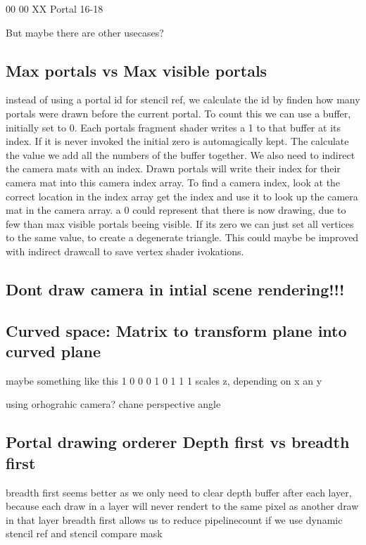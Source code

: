 00 00 XX Portal 16-18

But  maybe there are other usecases?




\subsection{Max portals vs Max visible portals}
instead of using a portal id for stencil ref, we calculate the id by finden how many portals were drawn before the current portal.
To count this we can use a buffer, initially set to 0. Each portals fragment shader writes a 1 to that buffer at its index. If it is never invoked the initial zero is automagically kept. The calculate the value we add all the numbers of the buffer together.
We also need to indirect the camera mats with an index. Drawn portals will write their index for their camera mat into this camera index array.
To find a camera index, look at the correct location in the index array get the index and use it to look up the camera mat in the camera array. a 0 could represent that there is now drawing, due to few than max visible portals beeing visible. If its zero we can just set all vertices to the same value, to create a degenerate triangle.
This could maybe be improved with indirect drawcall to save vertex shader ivokations.

\subsection{Dont draw camera in intial scene rendering!!!}

\subsection{ Curved space: Matrix to transform plane into curved plane}
maybe something like this
1 0 0
0 1 0
1 1 1
scales z, depending on x an y

using orhograhic camera?
chane perspective angle

\subsection{Portal drawing orderer Depth first vs breadth first}

breadth first seems better as we only need to clear depth buffer after each layer, because
each draw in a layer will never rendert to the same pixel as another draw in that layer
breadth first allows us to reduce pipelinecount if we use dynamic stencil ref and stencil compare mask

